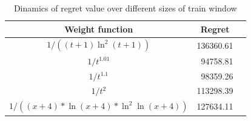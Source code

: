 \documentclass[12pt, twoside]{article}
\begin{document}
\begin{table}[h]

\centering

\begin{tabular}{ccr}

\toprule
Weight function & Regret \\
\midrule
$1 / ((t+1)\ln^2(t+1))$   & 136360.61 \\
$1 / t^{1.01}$  &\ 94758.81 \\
 $1 / t^{1.1}$&\ 98359.26 \\
$1 / t^{2}$ & 113298.39 \\
$1 / ((x + 4) * \ln(x + 4) * \ln^2\ln(x + 4)) $  & 127634.11 \\
\bottomrule
\end{tabular}


%

\caption{Dinamics of regret value over different sizes of train window} \hspace{16cm}
\end{table}
\end{document}
